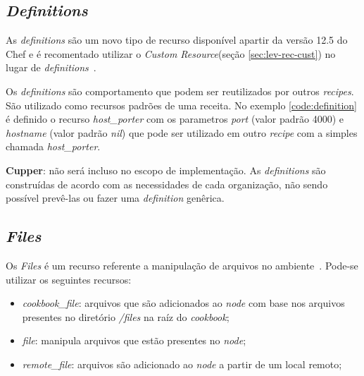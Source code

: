 \subsection{\textit{Definitions}}
\label{sec:lev-rec-def}

As \textit{definitions} são um novo tipo de recurso disponível apartir da versão
12.5 do Chef e é recomentado utilizar o \textit{Custom Resource}(seção \ref{sec:lev-rec-cust})
no lugar de \textit{definitions}~\cite{chefdoc:2016}.

Os \textit{definitions} são comportamento que podem ser reutilizados por outros \textit{recipes}.
São utilizado como recursos padrões de uma receita. No exemplo \ref{code:definition}
é definido o recurso \textit{host\_porter} com os parametros \textit{port} (valor padrão 4000)
e \textit{hostname} (valor padrão \textit{nil}) que pode ser utilizado em outro
\textit{recipe} com a simples chamada \textit{host\_porter}.

\begin{minipage}{.90\textwidth}
  \lstset{style=shell}
  
\end{minipage}

\textbf{Cupper}: não será incluso no escopo de implementação. As \textit{definitions} são
construídas de acordo com as necessidades de cada organização, não sendo
possível prevê-las ou fazer uma \textit{definition} genêrica.

\subsection{\textit{Files}}
\label{sec:cbfiles}

Os \textit{Files} é um recurso referente a manipulação de arquivos no ambiente~\cite{chefdoc:2016}.
Pode-se utilizar os seguintes recursos:

\begin{itemize}
  \item \textit{cookbook\_file}: arquivos que são adicionados ao \textit{node} com base
    nos arquivos presentes no diretório \textit{/files} na raíz do \textit{cookbook};
  \item \textit{file}: manipula arquivos que estão presentes no \textit{node};
  \item \textit{remote\_file}: arquivos são adicionado ao \textit{node} a partir de um
    local remoto;
\end{itemize}

